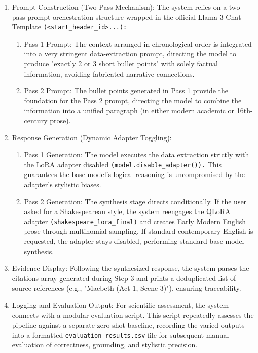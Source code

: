 \documentclass[10pt,conference]{IEEEtran}
\begin{document}
\begin{enumerate}
\begin{enumerate}
        \item Similarity Search and Sorting: The vectors are searched using the pre-compiled FAISS index (L2 distance metric). The five most distinctive segments are extracted and—importantly—reorganized in chronological order according to their Act and Scene information. This rigorously upholds temporal causality, stopping the LLM from mixing up narrative timelines.
    \end{enumerate}
    \item Prompt Construction (Two-Pass Mechanism): The system relies on a two-pass prompt orchestration structure wrapped in the official Llama 3 Chat Template 
    \verb|(<start_header_id>...):|
    \begin{enumerate}
        \item Pass 1 Prompt: The context arranged in chronological order is integrated into a very stringent data-extraction prompt, directing the model to produce "exactly 2 or 3 short bullet points" with solely factual information, avoiding fabricated narrative connections.
        \item Pass 2 Prompt: The bullet points generated in Pass 1 provide the foundation for the Pass 2 prompt, directing the model to combine the information into a unified paragraph (in either modern academic or 16th-century prose).
    \end{enumerate}
    \item Response Generation (Dynamic Adapter Toggling): 
    \begin{enumerate}
        \item Pass 1 Generation: The model executes the data extraction strictly with the LoRA adapter disabled 
        \verb|(model.disable_adapter()).|
        This guarantees the base model's logical reasoning is uncompromised by the adapter's stylistic biases.

        \item Pass 2 Generation: The synthesis stage directs conditionally. If the user asked for a Shakespearean style, the system reengages the QLoRA adapter 
        \verb|(shakespeare_lora_final)|
        and creates Early Modern English prose through multinomial sampling. If standard contemporary English is requested, the adapter stays disabled, performing standard base-model synthesis.
    \end{enumerate}
    \item Evidence Display: Following the synthesized response, the system parses the citations array generated during Step 3 and prints a deduplicated list of source references (e.g., "Macbeth (Act 1, Scene 3)"), ensuring traceability.
    \item Logging and Evaluation Output: For scientific assessment, the system connects with a modular evaluation script. This script repeatedly assesses the pipeline against a separate zero-shot baseline, recording the varied outputs into a formatted 
    \verb|evaluation_results.csv|
    file for subsequent manual evaluation of correctness, grounding, and stylistic precision.
\end{enumerate}
\end{document}
